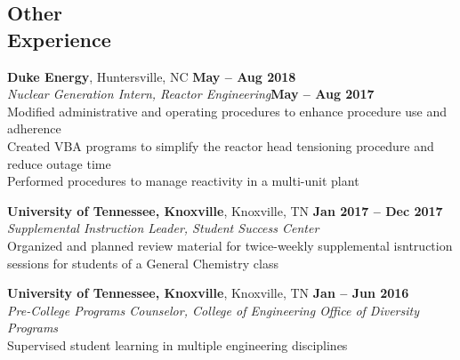 \documentclass[margin,line]{resume}
\begin{document}
\begin{resume}
    \section{\mysidestyle Other\\Experience}
    \textbf{Duke Energy}, Huntersville, NC \hfill \textbf{May -- Aug 2018}\\
                \textsl{Nuclear Generation Intern, Reactor Engineering}\hfill \textbf{May -- Aug 2017}\\
                Modified administrative and operating procedures to enhance procedure use and adherence \\
                Created VBA programs to simplify the reactor head tensioning procedure and reduce outage time \\
                Performed procedures to manage reactivity in a multi-unit plant 

    \textbf{University of Tennessee, Knoxville}, Knoxville, TN \hfill \textbf{Jan 2017 -- Dec 2017}\\
                \textsl{Supplemental Instruction Leader, Student Success Center}\\
                Organized and planned review material for twice-weekly supplemental isntruction sessions 
                for students of a General Chemistry class
                
    \textbf{University of Tennessee, Knoxville}, Knoxville, TN \hfill \textbf{Jan -- Jun 2016}\\
                \textsl{Pre-College Programs Counselor, College of Engineering Office of Diversity Programs}\\
                Supervised student learning in multiple engineering disciplines

\end{resume}
\end{document}
